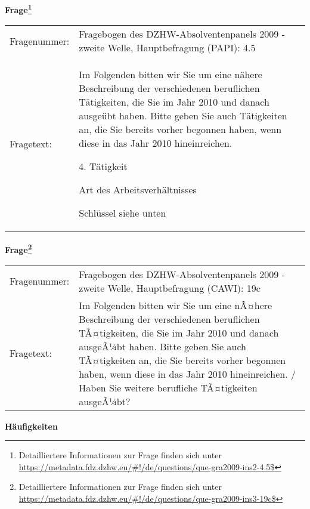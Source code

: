 				\vspace*{0.5cm}
                \noindent\textbf{Frage\footnote{Detailliertere Informationen zur Frage finden sich unter
		              \url{https://metadata.fdz.dzhw.eu/\#!/de/questions/que-gra2009-ins2-4.5$}}}\\
				\begin{tabularx}{\hsize}{@{}lX}
					Fragenummer: &
					  Fragebogen des DZHW-Absolventenpanels 2009 - zweite Welle, Hauptbefragung (PAPI):
					  4.5
 \\
					Fragetext: & Im Folgenden bitten wir Sie um eine nähere Beschreibung der verschiedenen beruflichen Tätigkeiten, die Sie im Jahr 2010 und danach ausgeübt haben. Bitte geben Sie auch Tätigkeiten an, die Sie bereits vorher begonnen haben, wenn diese in das Jahr 2010 hineinreichen.\par  4. Tätigkeit\par  Art des Arbeitsverhältnisses\par  Schlüssel siehe unten \\
				\end{tabularx}
				\vspace*{0.5cm}
                \noindent\textbf{Frage\footnote{Detailliertere Informationen zur Frage finden sich unter
		              \url{https://metadata.fdz.dzhw.eu/\#!/de/questions/que-gra2009-ins3-19c$}}}\\
				\begin{tabularx}{\hsize}{@{}lX}
					Fragenummer: &
					  Fragebogen des DZHW-Absolventenpanels 2009 - zweite Welle, Hauptbefragung (CAWI):
					  19c
 \\
					Fragetext: & Im Folgenden bitten wir Sie um eine nÃ¤here Beschreibung der verschiedenen beruflichen TÃ¤tigkeiten, die Sie im Jahr 2010 und danach ausgeÃ¼bt haben. Bitte geben Sie auch TÃ¤tigkeiten an, die Sie bereits vorher begonnen haben, wenn diese in das Jahr 2010 hineinreichen. / Haben Sie weitere berufliche TÃ¤tigkeiten ausgeÃ¼bt? \\
				\end{tabularx}





        		\vspace*{0.5cm}
                \noindent\textbf{Häufigkeiten}


